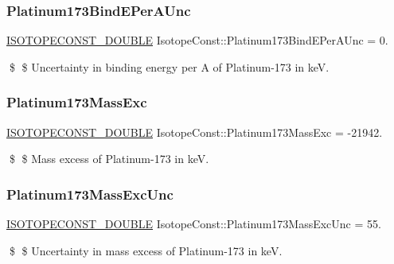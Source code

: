 \subsubsection{\texorpdfstring{Platinum173\+Bind\+E\+Per\+A\+Unc}{Platinum173BindEPerAUnc}}
{\footnotesize\ttfamily \mbox{\hyperlink{group___isotope_const-_macros_ga8f45a7272ce02c0b4c65c44636ed719a}{I\+S\+O\+T\+O\+P\+E\+C\+O\+N\+S\+T\+\_\+\+D\+O\+U\+B\+LE}} Isotope\+Const\+::\+Platinum173\+Bind\+E\+Per\+A\+Unc = 0.}

\$ \$ Uncertainty in binding energy per A of Platinum-\/173 in keV. \mbox{\label{group___isotope_const-_platinum-_pt173_gad729eb1c572065421f4f3b2641da453b}} 
\subsubsection{\texorpdfstring{Platinum173\+Mass\+Exc}{Platinum173MassExc}}
{\footnotesize\ttfamily \mbox{\hyperlink{group___isotope_const-_macros_ga8f45a7272ce02c0b4c65c44636ed719a}{I\+S\+O\+T\+O\+P\+E\+C\+O\+N\+S\+T\+\_\+\+D\+O\+U\+B\+LE}} Isotope\+Const\+::\+Platinum173\+Mass\+Exc = -\/21942.}

\$ \$ Mass excess of Platinum-\/173 in keV. \mbox{\label{group___isotope_const-_platinum-_pt173_gadc6c9a7e5e1b4432fe1e44a6eb105c54}} 
\subsubsection{\texorpdfstring{Platinum173\+Mass\+Exc\+Unc}{Platinum173MassExcUnc}}
{\footnotesize\ttfamily \mbox{\hyperlink{group___isotope_const-_macros_ga8f45a7272ce02c0b4c65c44636ed719a}{I\+S\+O\+T\+O\+P\+E\+C\+O\+N\+S\+T\+\_\+\+D\+O\+U\+B\+LE}} Isotope\+Const\+::\+Platinum173\+Mass\+Exc\+Unc = 55.}

\$ \$ Uncertainty in mass excess of Platinum-\/173 in keV. \mbox{\label{group___isotope_const-_platinum-_pt173_ga45f5c671c96f5fbc4a76d75455da8bb3}} 
